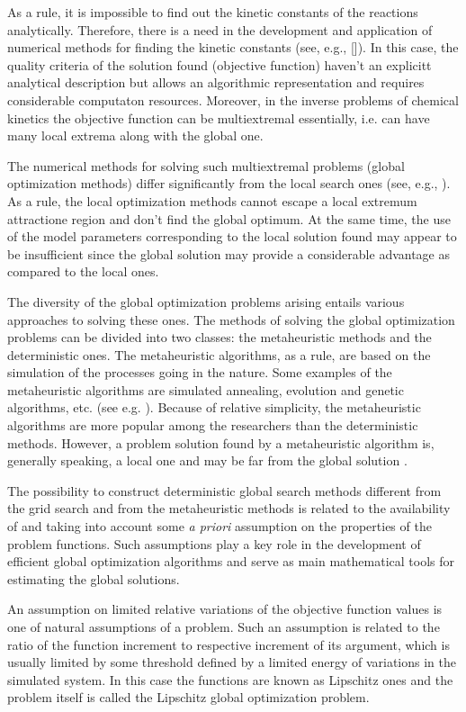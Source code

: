 \documentclass{svproc}
\begin{document}
As a rule, it is impossible to find out the kinetic constants of the reactions analytically. Therefore, there is a need in the development and application of numerical methods for finding the kinetic constants (see, e.g., []). In this case, the quality criteria of the solution found (objective function) haven't an explicitt analytical description but allows an algorithmic representation and requires considerable computaton resources. Moreover, in the inverse problems of chemical kinetics the objective function can be multiextremal essentially, i.e. can have many local extrema along with the global one. 

The numerical methods for solving such multiextremal problems (global optimization methods) differ significantly from the local search ones (see, e.g., \cite{Sergeyev2017,PaulaviciusZilinskas2014}). As a rule, the local optimization methods cannot escape a local extremum attractione region and don't find the global optimum. At the same time, the use of the model parameters corresponding to the local solution found may appear to be insufficient since the global solution may provide a considerable advantage as compared to the local ones. 

The diversity of the global optimization problems arising entails various approaches to solving these ones. The methods of solving the global optimization problems can be divided into two classes: the metaheuristic methods and the deterministic ones. The metaheuristic algorithms, as a rule, are based on the simulation of the processes going in the nature. Some examples of the metaheuristic algorithms are simulated annealing, evolution and genetic algorithms, etc. (see e.g. \cite{Battiti2009,Eiben2015}). Because of relative simplicity, the metaheuristic algorithms are more popular among the researchers than the deterministic methods. 
However, a problem solution found by a metaheuristic algorithm is, generally speaking, a local one and may be far from the global solution \cite{Kvasov2018}. 

The possibility to construct deterministic global search methods different from the grid search and from the metaheuristic methods is related to the availability of and taking into account some {\it a priori} assumption on the properties of the problem functions. Such assumptions play a key role in the development of efficient global optimization algorithms and serve as main mathematical tools for estimating the global solutions.

An assumption on limited relative variations of the objective function values is one of natural assumptions of a problem. Such an assumption is related to the ratio of the function increment to respective increment of its argument, which is usually limited by some threshold defined by a limited energy of variations in the simulated system. In this case the functions are known as Lipschitz ones and the problem itself is called the Lipschitz global optimization problem. 
\end{document}
